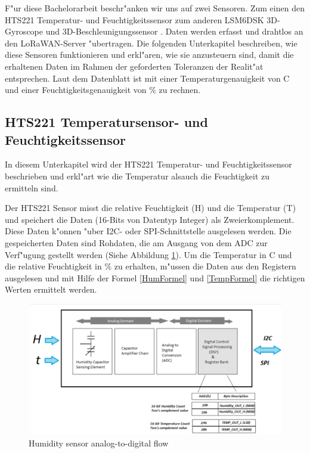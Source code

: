 \vspace{5cm}
F"ur diese Bachelorarbeit beschr"anken wir uns auf zwei Sensoren. 
Zum einen den HTS221\cite{HTS221} Temperatur- und Feuchtigkeitssensor 
zum anderen LSM6DSK 3D-Gyroscope und 3D-Beschleunigungssensor 
\cite{LSM6DSL}. Daten werden erfasst und drahtlos an den 
LoRaWAN-Server "ubertragen. Die folgenden Unterkapitel beschreiben, 
wie diese Sensoren funktionieren und erkl"aren, wie sie anzusteuern 
sind, damit die erhaltenen Daten im Rahmen der geforderten Toleranzen 
der Realit"at entsprechen. Laut dem Datenblatt ist mit einer 
Temperaturgenauigkeit von \textdegree{}C und einer 
Feuchtigkeitsgenauigkeit von \%   zu rechnen. 

\subsection {HTS221 Temperatursensor- und Feuchtigkeitssensor}\label{Temp}
In diesem Unterkapitel wird der HTS221 Temperatur- und 
Feuchtigkeitssensor beschrieben und erkl"art wie die Temperatur alsauch 
die Feuchtigkeit zu ermitteln sind.

Der HTS221 Sensor misst die relative Feuchtigkeit (H) und die 
Temperatur (T) und speichert die Daten (16-Bits von Datentyp Integer) 
als Zweierkomplement. Diese Daten k"onnen "uber I2C- oder 
SPI-Schnittstelle ausgelesen werden. Die gespeicherten Daten sind 
Rohdaten, die am Ausgang von dem \ac{ADC} zur Verf"ugung gestellt werden (Siehe 
Abbildung \ref{HT_sensor}). Um die Temperatur in \textdegree{}C und 
die relative Feuchtigkeit in \% zu erhalten, m"ussen die Daten aus 
den Registern ausgelesen und mit Hilfe der Formel \ref{HumFormel} und 
\ref{TempFormel} die richtigen Werten ermittelt werden.

\begin{figure}[h]
	\centering
	\includegraphics[width=14cm]{source/images/HTS221_sensor}
	\caption{Humidity sensor analog-to-digital flow 
	\cite{HTS221}}\label{HT_sensor}
\end{figure}

